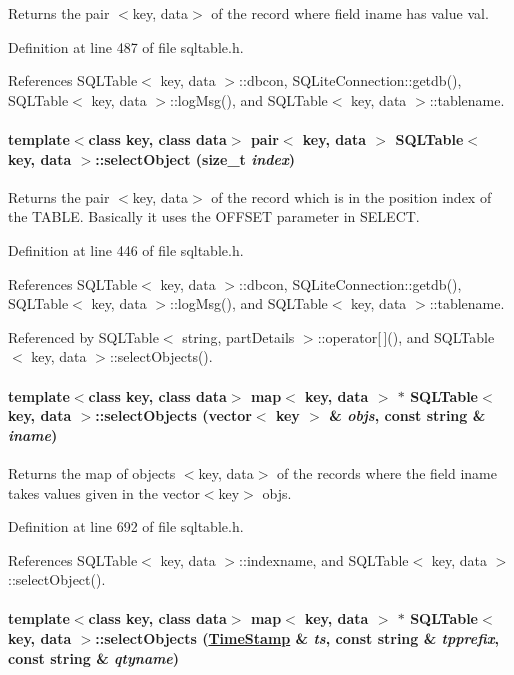 Returns the pair $<$key, data$>$ of the record where field iname has value val. 

Definition at line 487 of file sqltable.h.

References SQLTable$<$ key, data $>$::dbcon, SQLite\-Connection::getdb(), SQLTable$<$ key, data $>$::log\-Msg(), and SQLTable$<$ key, data $>$::tablename.\hypertarget{classSQLTable_SQLTablea7}{
\paragraph[selectObject]{\setlength{\rightskip}{0pt plus 5cm}template$<$class key, class data$>$ pair$<$ key, data $>$ SQLTable$<$ key, data $>$::select\-Object (size\_\-t {\em index})}\hfill}
\label{classSQLTable_SQLTablea7}


Returns the pair $<$key, data$>$ of the record which is in the position index of the TABLE. Basically it uses the OFFSET parameter in SELECT. 

Definition at line 446 of file sqltable.h.

References SQLTable$<$ key, data $>$::dbcon, SQLite\-Connection::getdb(), SQLTable$<$ key, data $>$::log\-Msg(), and SQLTable$<$ key, data $>$::tablename.

Referenced by SQLTable$<$ string, part\-Details $>$::operator\mbox{[}$\,$\mbox{]}(), and SQLTable$<$ key, data $>$::select\-Objects().\hypertarget{classSQLTable_SQLTablea12}{
\paragraph[selectObjects]{\setlength{\rightskip}{0pt plus 5cm}template$<$class key, class data$>$ map$<$ key, data $>$ $\ast$ SQLTable$<$ key, data $>$::select\-Objects (vector$<$ key $>$ \& {\em objs}, const string \& {\em iname})}\hfill}
\label{classSQLTable_SQLTablea12}


Returns the map of objects $<$key, data$>$ of the records where the field iname takes values given in the vector$<$key$>$ objs. 

Definition at line 692 of file sqltable.h.

References SQLTable$<$ key, data $>$::indexname, and SQLTable$<$ key, data $>$::select\-Object().\hypertarget{classSQLTable_SQLTablea11}{
\paragraph[selectObjects]{\setlength{\rightskip}{0pt plus 5cm}template$<$class key, class data$>$ map$<$ key, data $>$ $\ast$ SQLTable$<$ key, data $>$::select\-Objects (\hyperlink{classTimeStamp}{Time\-Stamp} \& {\em ts}, const string \& {\em tpprefix}, const string \& {\em qtyname})}\hfill}
\label{classSQLTable_SQLTablea11}


